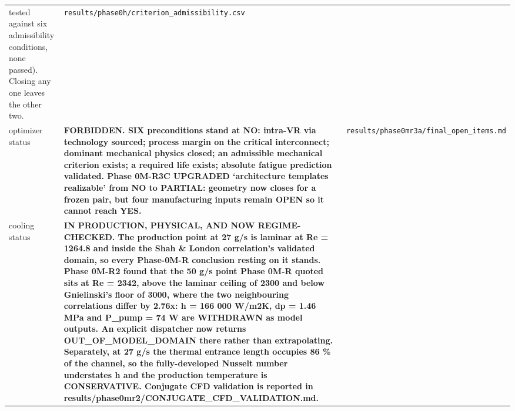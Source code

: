 \documentclass[10pt,]{article}
\begin{document}
\begin{longtable}[]{@{}lll@{}}
\begin{minipage}[t]{0.30\columnwidth}
{tested against six admissibility conditions, none passed). Closing any
one leaves the other two.}\strut
\end{minipage} & \begin{minipage}[t]{0.30\columnwidth}\raggedright
\texttt{results/phase0h/criterion\_admissibility.csv}\strut
\end{minipage}\tabularnewline
\begin{minipage}[t]{0.30\columnwidth}\raggedright
optimizer status\strut
\end{minipage} & \begin{minipage}[t]{0.30\columnwidth}\raggedright
\textbf{FORBIDDEN. SIX preconditions stand at NO: intra-VR via
technology sourced; process margin on the critical interconnect;
dominant mechanical physics closed; an admissible mechanical criterion
exists; a required life exists; absolute fatigue prediction validated.
Phase 0M-R3C UPGRADED `architecture templates realizable' from NO to
PARTIAL: geometry now closes for a frozen pair, but four manufacturing
inputs remain OPEN so it cannot reach YES.}\strut
\end{minipage} & \begin{minipage}[t]{0.30\columnwidth}\raggedright
\texttt{results/phase0mr3a/final\_open\_items.md}\strut
\end{minipage}\tabularnewline
\begin{minipage}[t]{0.30\columnwidth}\raggedright
cooling status\strut
\end{minipage} & \begin{minipage}[t]{0.30\columnwidth}\raggedright
\textbf{IN PRODUCTION, PHYSICAL, AND NOW REGIME-CHECKED. The production
point at 27 g/s is laminar at Re = 1264.8 and inside the Shah \& London
correlation's validated domain, so every Phase-0M-R conclusion resting
on it stands. Phase 0M-R2 found that the 50 g/s point Phase 0M-R quoted
sits at Re = 2342, above the laminar ceiling of 2300 and below
Gnielinski's floor of 3000, where the two neighbouring correlations
differ by 2.76x: h = 166 000 W/m2K, dp = 1.46 MPa and P\_pump = 74 W are
WITHDRAWN as model outputs. An explicit dispatcher now returns
OUT\_OF\_MODEL\_DOMAIN there rather than extrapolating. Separately, at
27 g/s the thermal entrance length occupies 86 \% of the channel, so the
fully-developed Nusselt number understates h and the production
temperature is CONSERVATIVE. Conjugate CFD validation is reported in
results/phase0mr2/CONJUGATE\_CFD\_VALIDATION.md.}\strut
\end{minipage} & \begin{minipage}[t]{0.30\columnwidth}\raggedright

\end{minipage}
\end{longtable}
\end{document}

